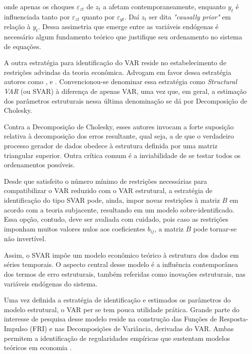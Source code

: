 onde apenas os choques \(\varepsilon_{zt}\) de \(z_t\) a afetam contemporaneamente, enquanto \(y_t\) é influenciada tanto por \(\varepsilon_{zt}\) quanto por \(\varepsilon_{yt}\). Daí \(z_t\) ser dita \textit{"causally prior"} em relação à \(y_t\). Dessa assimetria que emerge entre as variáveis endógenas é necessário algum fundamento teórico que justifique seu ordenamento no sistema de equações. 

A outra estratégia para identificação do VAR reside no estabelecimento de restrições advindas da teoria econômica. Advogam em favor dessa estratégia autores como \textcite{sims_are_1986}, \textcite{bernanke_alternative_1986} e \textcite{blanchard_dynamic_1988}. Convencionou-se denominar essa estratégia como \textit{Structural VAR} (ou SVAR) à diferença de apenas VAR, uma vez que, em geral, a estimação dos parâmetros estruturais nessa última denominação se dá por Decomposição de Cholesky.

Contra a Decomposição de Cholesky, esses autores invocam a forte suposição relativa à decomposição dos erros resultante, qual seja, a de que o verdadeiro processo gerador de dados obedece à estrutura definida por uma matriz triangular superior. Outra crítica comum é a inviabilidade de se testar todos os ordenamentos possíveis. 

Desde que satisfeito o número mínimo de restrições necessárias para compatibilizar o VAR reduzido com o VAR estrutural, a estratégia de identificação do tipo SVAR pode, ainda, impor novas restrições à matriz \(B\) em acordo com a teoria subjacente, resultando em um modelo sobre-identificado. Essa opção, contudo, deve ser avaliada com cuidado, pois caso as restrições imponham muitos valores nulos aos coeficientes \(b_{ij}\), a matriz \(B\) pode tornar-se não invertível. 

Assim, o SVAR impõe um modelo econômico teórico à estrutura dos dados em séries temporais. O aspecto central desse modelo é a influência contemporânea dos termos de erro estruturais, também referidas como inovações estruturais, nas variáveis endógenas do sistema. 

Uma vez definida a estratégia de identificação e estimados os parâmetros do modelo estrutural, o VAR per se tem pouca utilidade prática. Grande parte do interesse de pesquisa desse modelo reside na construção das Funções de Resposta-Impulso (FRI) e nas Decomposições de Variância, derivadas do VAR. Ambas permitem a identificação de regularidades empíricas que sustentam modelos teóricos em economia \parencite{jorda_estimation_2005}. 


